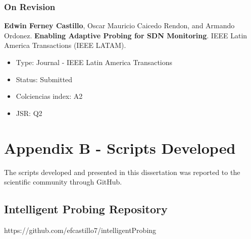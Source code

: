 \subsection{On Revision}
\textbf{Edwin Ferney Castillo}, Oscar Mauricio Caicedo Rendon, and Armando Ordonez. \textbf{Enabling Adaptive Probing for SDN Monitoring}. IEEE Latin America Transactions (IEEE LATAM).

\begin{itemize}
    \item Type: Journal - IEEE Latin America Transactions
    \item Status: Submitted
    \item Colciencias index: A2
    \item JSR: Q2 
\end{itemize}{}

\chapter{Appendix B - Scripts Developed}
The scripts developed and presented in this dissertation was reported to the scientific community through GitHub.

\section{Intelligent Probing Repository}

https://github.com/efcastillo7/intelligentProbing

 
 